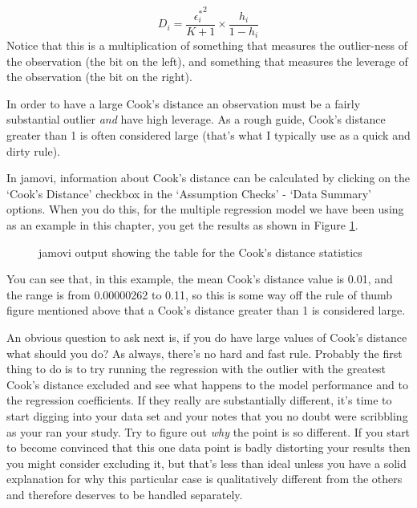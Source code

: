 \vspace{0.5cm}
\begin{mdframed}[style=MyFrame,nobreak=true]
$$
D_i = \frac{{\epsilon_i^*}^2 }{K+1} \times \frac{h_i}{1-h_i}
$$ 
Notice that this is a multiplication of something that measures the outlier-ness of the observation (the bit on the left), and something that measures the leverage of the observation (the bit on the right). 
\end{mdframed}

In order to have a large Cook's distance an observation must be a fairly substantial outlier {\it and} have high leverage. As a rough guide, Cook's distance greater than 1 is often considered large (that's what I typically use as a quick and dirty rule). 

In jamovi, information about Cook's distance can be calculated by clicking on the `Cook's Distance' checkbox in the `Assumption Checks' - `Data Summary' options. When you do this, for the multiple regression model we have been using as an example in this chapter, you get the results as shown in Figure \ref{fig:reg4}. 

\begin{figure}[!htb]
\begin{center}
\caption{jamovi output showing the table for the Cook's distance statistics}
\HR
\label{fig:reg4}
\end{center}
\end{figure}

You can see that, in this example, the mean Cook's distance value is 0.01, and the range is from 0.00000262 to 0.11, so this is some way off the rule of thumb figure mentioned above that a Cook's distance greater than 1 is considered large. 

An obvious question to ask next is, if you do have large values of Cook's distance what should you do? As always, there's no hard and fast rule. Probably the first thing to do is to try running the regression with the outlier with the greatest Cook's distance excluded and see what happens to the model performance and to the regression coefficients. If they really are substantially different, it's time to start digging into your data set and your notes that you no doubt were scribbling as your ran your study. Try to figure out {\it why} the point is so different. If you start to become convinced that this one data point is badly distorting your results then you might consider excluding it, but that's less than ideal unless you have a solid explanation for why this particular case is qualitatively different from the others and therefore deserves to be handled separately.

